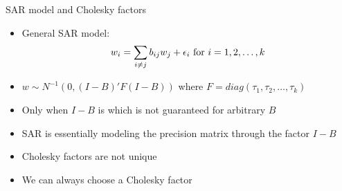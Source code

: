 
\begin{frame}{SAR model and Cholesky factors}
	\begin{itemize}
		\item General SAR model: \[
		w_i = \sum_{i \neq j} b_{ij} w_j + \epsilon_i \mbox{ for } i=1,2,\ldots,k
		\]
		\item $w \sim N^{-1}(0, (I-B)'F(I-B))$ where $F=diag(\tau_1,\tau_2,\ldots,\tau_k)$
		\item Only  when $I-B$ is  which is not guaranteed for arbitrary $B$
		\item SAR is essentially modeling the precision matrix through the  factor $I-B$
		\pause 
		\item Cholesky factors are not unique
		\item We can always choose a  Cholesky factor
	\end{itemize}
\end{frame}

